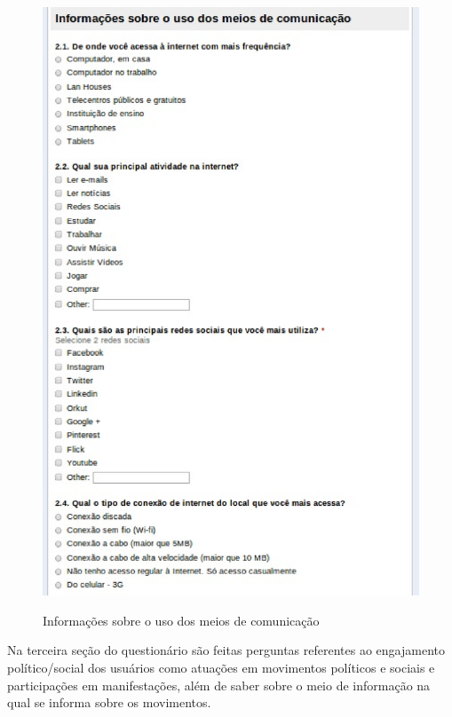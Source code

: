 \begin{figure}[!h]
    \centering
    \includegraphics[keepaspectratio=true,scale=0.60]
      {figuras/perf03.eps}
    \label{meiosdecomunicaçaõ}
	\caption{Informações sobre o uso dos meios de comunicação}
\end{figure}

\newpage


	Na terceira seção do questionário são feitas perguntas referentes ao engajamento político/social dos usuários como atuações em movimentos políticos e sociais e participações em manifestações, além de saber sobre o meio de informação na qual se informa sobre os movimentos.





